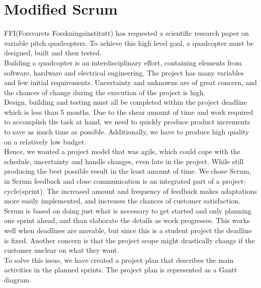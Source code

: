 \section{Modified Scrum}

FFI(Forsvarets Forskningsinstitutt) has requested a scientific research paper on variable pitch quadcopters. To achieve this high level goal, a quadcopter must be designed, built and then tested.
\\
\newline
Building a quadcopter is an interdisciplinary effort, containing elements from software, hardware and electrical engineering. The project has many variables and few initial requirements. Uncertainty and unknowns are of great concern, and the chances of change during the execution of the project is high. 
\\
\newline
Design, building and testing must all be completed within the project deadline which is less than 5 months. Due to the shear amount of time and work required to accomplish the task at hand, we need to quickly produce product increments to save as much time as possible. Additionally, we have to produce high quality on a relatively low budget.
\\
\newline
Hence, we wanted a project model that was agile, which could cope with the schedule, uncertainty and handle changes, even late in the project. While still producing the best possible result in the least amount of time. We chose Scrum, in Scrum feedback and close communication is an integrated part of a project- cycle(sprint). The increased amount and frequency of feedback makes adaptations more easily implemented, and increases the chances of customer satisfaction.  
\\
\newline
Scrum is based on doing just what is necessary to get started and only planning one sprint ahead, and than elaborate the details as work progresses. This works well when deadlines are movable, but since this is a student project the deadline is fixed. Another concern is that the project scope might drastically change if the customer unclear on what they want.
\\
\newline
To solve this issue, we have created a project plan that describes the main activities in the planned sprints. The project plan is represented as a Gantt diagram.  
\\
\newline
